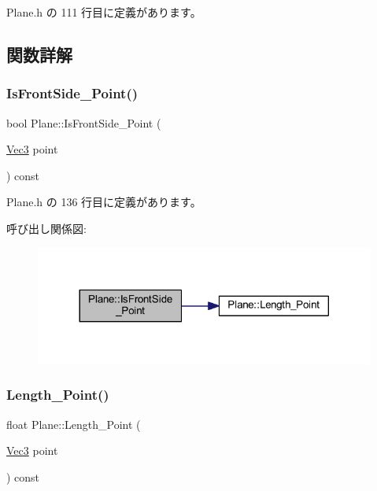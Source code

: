  Plane.\+h の 111 行目に定義があります。



\subsection{関数詳解}
\mbox{\label{class_plane_afb752b43ee18e5e99f2682595d35fd87}} 
\subsubsection{\texorpdfstring{Is\+Front\+Side\+\_\+\+Point()}{IsFrontSide\_Point()}}
{\footnotesize\ttfamily bool Plane\+::\+Is\+Front\+Side\+\_\+\+Point (\begin{DoxyParamCaption}\item[{\mbox{\hyperlink{_vector3_d_8h_ab16f59e4393f29a01ec8b9bbbabbe65d}{Vec3}}}]{point }\end{DoxyParamCaption}) const\hspace{0.3cm}{\ttfamily [inline]}}



 Plane.\+h の 136 行目に定義があります。

呼び出し関係図\+:\nopagebreak
\begin{figure}[H]
\begin{center}
\leavevmode
\includegraphics[width=317pt]{class_plane_afb752b43ee18e5e99f2682595d35fd87_cgraph}
\end{center}
\end{figure}
\mbox{\label{class_plane_af0315d2a7aebf6057410799f127b6c17}} 
\subsubsection{\texorpdfstring{Length\+\_\+\+Point()}{Length\_Point()}}
{\footnotesize\ttfamily float Plane\+::\+Length\+\_\+\+Point (\begin{DoxyParamCaption}\item[{\mbox{\hyperlink{_vector3_d_8h_ab16f59e4393f29a01ec8b9bbbabbe65d}{Vec3}}}]{point }\end{DoxyParamCaption}) const\hspace{0.3cm}{\ttfamily [inline]}}



